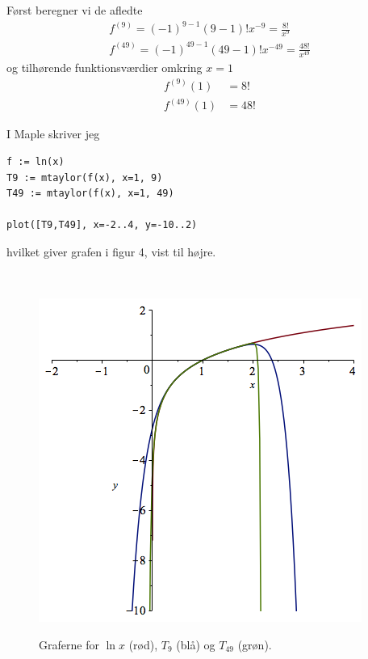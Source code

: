 \documentclass[11pt,a4paper]{article}
\begin{document}
\begin{multicols}{2}

    Først beregner vi de afledte
    \begin{align}
        f^{(9)} = (-1)^{9-1} (9 - 1)! x^{-9}
                = \frac{8!}{x^9} \\
        f^{(49)} = (-1)^{49-1} (49 - 1)! x^{-49}
                 = \frac{48!}{x^{49}}
    \end{align}
    og tilhørende funktionsværdier omkring $x = 1$
    \begin{align}
        f^{(9)} (1) &= 8! \\
        f^{(49)} (1) &= 48!
    \end{align}

    I Maple skriver jeg
    \begin{lstlisting}
f := ln(x)
T9 := mtaylor(f(x), x=1, 9)
T49 := mtaylor(f(x), x=1, 49)

plot([T9,T49], x=-2..4, y=-10..2)
    \end{lstlisting}
    hvilket giver grafen i figur 4, vist til højre.

    \vfill{\ }\columnbreak

    \begin{figure}[H]
        \centering
        \includegraphics[scale=0.4]{figures/5-3a.png}
        \label{fig:5.3a}
        \caption{Graferne for $\ln x$ (rød), $T_9$ (blå) og $T_49$ (grøn).}
    \end{figure}

\end{multicols}
\end{document}
